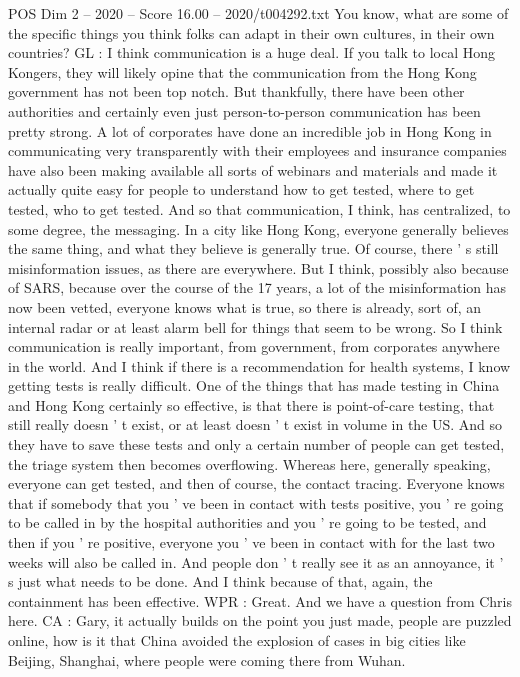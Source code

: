 \begin{textsample}{POS Dim 2 – 2020 – Score 16.00 – 2020/t004292.txt}
You know, what are some of the specific things you think folks can adapt in their own cultures, in their own countries?
GL : I think communication is a huge deal.
If you talk to local Hong Kongers, they will likely opine that the communication from the Hong Kong government has not been top notch.
But thankfully, there have been other authorities and certainly even just person-to-person communication has been pretty strong.
A lot of corporates have done an incredible job in Hong Kong in communicating very transparently with their employees and insurance companies have also been making available all sorts of webinars and materials and made it actually quite easy for people to understand how to get tested, where to get tested, who to get tested.
And so that communication, I think, has centralized, to some degree, the messaging.
In a city like Hong Kong, everyone generally believes the same thing, and what they believe is generally true.
Of course, there ' s still misinformation issues, as there are everywhere.
But I think, possibly also because of SARS, because over the course of the 17 years, a lot of the misinformation has now been vetted, everyone knows what is true, so there is already, sort of, an internal radar or at least alarm bell for things that seem to be wrong.
So I think communication is really important, from government, from corporates anywhere in the world.
And I think if there is a recommendation for health systems, I know getting tests is really difficult.
One of the things that has made testing in China and Hong Kong certainly so effective, is that there is point-of-care testing, that still really doesn ' t exist, or at least doesn ' t exist in volume in the US.
And so they have to save these tests and only a certain number of people can get tested, the triage system then becomes overflowing.
Whereas here, generally speaking, everyone can get tested, and then of course, the contact tracing.
Everyone knows that if somebody that you ' ve been in contact with tests positive, you ' re going to be called in by the hospital authorities and you ' re going to be tested, and then if you ' re positive, everyone you ' ve been in contact with for the last two weeks will also be called in.
And people don ' t really see it as an annoyance, it ' s just what needs to be done.
And I think because of that, again, the containment has been effective.
WPR : Great.
And we have a question from Chris here.
CA : Gary, it actually builds on the point you just made, people are puzzled online, how is it that China avoided the explosion of cases in big cities like Beijing, Shanghai, where people were coming there from Wuhan.

\end{textsample}
